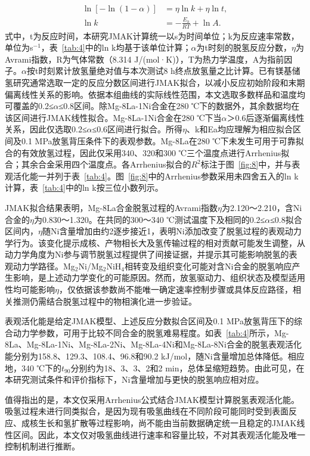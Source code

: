\documentclass[UTF8,10pt]{ctexart}
\begin{document}
\begin{align}
\ln[-\ln(1-\alpha)] &= \eta\ln k+\eta\ln t, \label{eq:5}\\
\ln k &= -\frac{E_{\mathrm{a}}}{RT}+\ln A. \label{eq:6}
\end{align}
式中，t为反应时间，本研究JMAK计算统一以s为时间单位；k为反应速率常数，单位为s$^{-1}$，表~\ref{tab:4}中的ln k均基于该单位计算；$\alpha$为t时刻的脱氢反应分数，$\eta$为Avrami指数，R为气体常数（8.314 J/(mol·K)），T为热力学温度，A为指前因子。$\alpha$按t时刻累计放氢量绝对值与本次测试8 h终点放氢量之比计算。已有镁基储氢研究通常选取一定的反应分数区间进行JMAK拟合，以减小反应初始阶段和末期偏离线性关系的影响\cite{ref19,ref20}。依据本组曲线的实际线性范围，本文选取多数样品和温度均可覆盖的0.2≤$\alpha$≤0.8区间。除Mg-8La-1Ni合金在280 ℃下的数据外，其余数据均在该区间进行JMAK线性拟合。Mg-8La-1Ni合金在280 ℃下当$\alpha$＞0.6后逐渐偏离线性关系，因此仅选取0.2≤$\alpha$≤0.6区间进行拟合。所得$\eta$、k和Ea均应理解为相应拟合区间及0.1 MPa放氢背压条件下的表观参数。Mg-8La在280 ℃下未发生可用于可靠拟合的有效放氢过程，因此仅采用340、320和300 ℃三个温度点进行Arrhenius拟合；其余合金采用四个温度点。各Arrhenius拟合的$R^2$标注于图~\ref{fig:8}中，并与表观活化能一并列于表~\ref{tab:4}。图~\ref{fig:8}中的Arrhenius参数采用未四舍五入的ln k计算，表~\ref{tab:4}中的ln k按三位小数列示。

JMAK拟合结果表明，Mg-8La合金脱氢过程的Avrami指数$\eta$为2.120～2.210，含Ni合金的$\eta$为0.830～1.320。在共同的300～340 ℃测试温度下及相同的0.2≤$\alpha$≤0.8拟合区间内，$\eta$随Ni含量增加由约2逐步接近1，表明Ni添加改变了脱氢过程的表观动力学行为。该变化提示成核、产物相长大及氢传输过程的相对贡献可能发生调整\cite{ref17,ref18}，从动力学角度为Ni参与调节脱氢过程提供了间接证据，并提示其可能影响脱氢的表观动力学路径。Mg$_2$Ni/Mg$_2$NiH$_4$相转变及组织变化可能对含Ni合金的脱氢响应产生影响，是上述动力学变化的可能原因。然而，放氢驱动力、组织状态及模型适用性均可能影响$\eta$，仅依据该参数尚不能唯一确定速率控制步骤或具体反应路径，相关推测仍需结合脱氢过程中的物相演化进一步验证。

表观活化能是给定JMAK模型、上述反应分数拟合区间及0.1 MPa放氢背压下的综合动力学参数，可用于比较不同合金的脱氢难易程度。如表~\ref{tab:4}所示，Mg-8La、Mg-8La-1Ni、Mg-8La-2Ni、Mg-8La-4Ni和Mg-8La-8Ni合金的脱氢表观活化能分别为158.8、129.3、108.4、96.8和90.2 kJ/mol，随Ni含量增加总体降低。相应地，340 ℃下的$t_{90}$分别约为18、3、3、2和2 min，总体呈缩短趋势。由此可见，在本研究测试条件和评价指标下，Ni含量增加与更快的脱氢响应相对应。

值得指出的是，本文仅采用Arrhenius公式结合JMAK模型计算脱氢表观活化能。吸氢过程未进行同类拟合，是因为现有吸氢曲线在不同阶段可能同时受到表面反应、成核生长和氢扩散等过程影响，尚不能由当前数据确定统一且稳定的JMAK线性区间。因此，本文仅对吸氢曲线进行速率和容量比较，不对其表观活化能及唯一控制机制进行推断。
\end{document}
